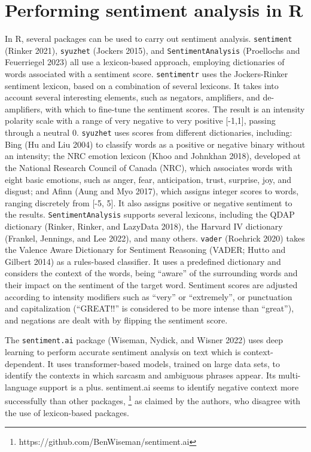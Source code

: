 \section{Performing sentiment analysis in
R}\label{performing-sentiment-analysis-in-r}

In R, several packages can be used to carry out sentiment analysis. \texttt{sentiment} (Rinker 2021), \texttt{syuzhet} (Jockers 2015), and \texttt{SentimentAnalysis} (Proellochs and
Feuerriegel 2023) all use a lexicon-based approach, employing
dictionaries of words associated with a sentiment score.
\texttt{sentimentr} uses the Jockers-Rinker sentiment lexicon, based on
a combination of several lexicons. It takes into account several
interesting elements, such as negators, amplifiers, and de-amplifiers, with which
to fine-tune the sentiment scores. The result is an intensity polarity
scale with a range of very negative to very positive {[}-1,1{]}, passing
through a neutral 0. \texttt{syuzhet} uses scores from different
dictionaries, including: Bing (Hu and Liu 2004) to classify
words as a positive or negative binary without an intensity; the NRC emotion
lexicon (Khoo and Johnkhan 2018), developed at the National Research
Council of Canada (NRC), which associates words with eight basic emotions,
such as anger, fear, anticipation, trust, surprise, joy, and disgust; and
Afinn (Aung and Myo 2017), which assigns integer scores to words, ranging
discretely from {[}-5, 5{]}. It also assigns positive or negative
sentiment to the results. \texttt{SentimentAnalysis} supports several
lexicons, including the QDAP dictionary (Rinker, Rinker, and LazyData
2018), the Harvard IV dictionary (Frankel, Jennings, and Lee 2022), and
many others. \texttt{vader} (Roehrick 2020) takes the Valence Aware
Dictionary for Sentiment Reasoning (VADER; Hutto and Gilbert 2014)
as a rules-based classifier. It uses a predefined dictionary and
considers the context of the words, being ``aware'' of the surrounding
words and their impact on the sentiment of the target word. Sentiment
scores are adjusted according to intensity modifiers such as ``very'' or
``extremely'', or punctuation and capitalization (``GREAT!!'' is considered to be more
intense than ``great''), and negations are dealt with by flipping the
sentiment score.

The \texttt{sentiment.ai} package (Wiseman, Nydick, and Wisner 2022)
uses deep learning to perform accurate sentiment analysis on text which
is context-dependent. It uses transformer-based models,
trained on large data sets, to identify the contexts in which sarcasm
and ambiguous phrases appear. Its multi-language support is a plus.
sentiment.ai seems to identify negative context more successfully than
other packages, \footnote{https://github.com/BenWiseman/sentiment.ai} as
claimed by the authors, who disagree with the use of lexicon-based
packages.

